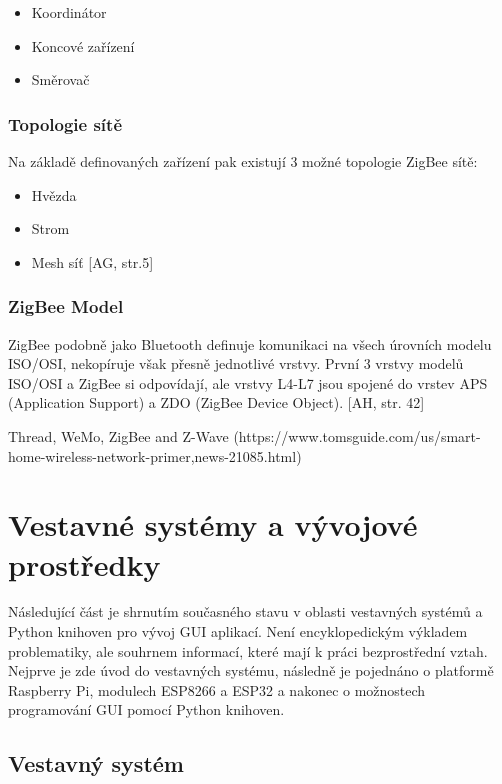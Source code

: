 \begin{itemize}
    \item Koordinátor
    \item Koncové zařízení
    \item Směrovač
\end{itemize}

\subsection*{Topologie sítě}
Na základě definovaných zařízení pak existují 3 možné topologie ZigBee sítě:

\begin{itemize}
    \item Hvězda
    \item Strom
    \item Mesh síť [AG, str.5]
\end{itemize}

\subsection*{ZigBee Model}
ZigBee podobně jako Bluetooth definuje komunikaci na všech úrovních modelu ISO/OSI, nekopíruje však přesně jednotlivé vrstvy. První 3 vrstvy modelů ISO/OSI a ZigBee si odpovídají, ale vrstvy L4-L7 jsou spojené do vrstev APS (Application Support) a ZDO (ZigBee Device Object). [AH, str. 42]\newline

Thread, WeMo, ZigBee and Z-Wave (https://www.tomsguide.com/us/smart-home-wireless-network-primer,news-21085.html)

\chapter{Vestavné systémy a vývojové prostředky}
\label{vestavne-systemy}
Následující část je shrnutím současného stavu v oblasti vestavných systémů a Python knihoven pro vývoj GUI aplikací. Není encyklopedickým výkladem problematiky, ale souhrnem informací, které mají k práci bezprostřední vztah. Nejprve je zde úvod do vestavných systému, následně je pojednáno o platformě Raspberry Pi, modulech ESP8266 a ESP32 a nakonec o možnostech programování GUI pomocí Python knihoven.

\section{Vestavný systém}

